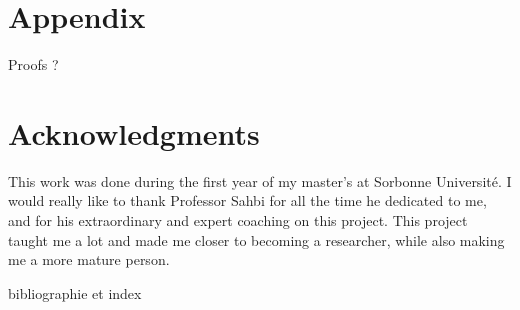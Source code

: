\documentclass{article}
\theoremstyle{definition}
\begin{document}
\newpage
\appendix
\section{Appendix}
Proofs ?

\section*{Acknowledgments}
This work was done during the first year of my master's at Sorbonne Université. I would really like to thank Professor Sahbi for all the time he dedicated to me, and for his extraordinary and expert coaching on this project. This project taught me a lot and made me closer to becoming a researcher, while also making me a more mature person.
\listoffigures
\listoftables
bibliographie et index



\end{document}
